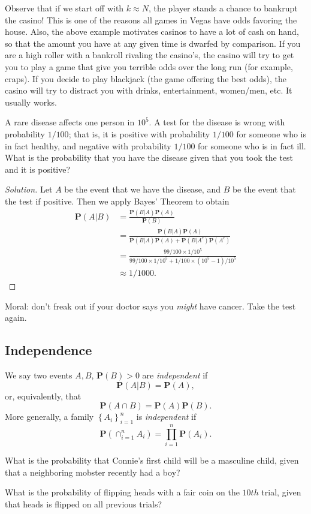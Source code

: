 Observe that if we start off with $k \approx N$, the player stands a chance to
bankrupt the casino! This is one of the reasons all games in Vegas have odds
favoring the house. Also, the above example motivates casinos to have a lot of
cash on hand, so that the amount you have at any given time is dwarfed by
comparison. If you are a high roller with a bankroll rivaling the casino's,
the casino will try to get you to play a game that give you terrible odds over
the long run (for example, craps). If you decide to play blackjack (the game
offering the best odds), the casino will try to distract you with drinks,
entertainment, women/men, etc. It usually works.
\begin{example}
	A rare disease affects one person in $10^5$. A test for the disease
	is wrong with probability $1/100$; that is, it is positive with probability
	$1/100$ for someone who is in fact healthy, and negative
	with probability $1/100$ for someone who is in fact ill. What is the 
	probability
	that you have the disease given that you took the test and it is positive?
\end{example}
\begin{proof}[Solution]
	Let $A$ be the event that we have the disease, and $B$ be the event
	that the test if positive. Then we apply
	Bayes' Theorem to obtain
	\begin{align*}
		\mathbf{P}(A | B) & = \frac{\mathbf{P}(B | A) \mathbf{P}(A)}{\mathbf{P}(B)}
		\\
		& = \frac{\mathbf{P}(B | A) \mathbf{P}(A)}{\mathbf{P}(B|A) \mathbf{P}(A) + \mathbf{P}(B | A^c)
		\mathbf{P}(A^c)}
		\\
		& = \frac{99/100 \times 1/10^5}{99/100 \times 1/10^5 + 1/100 \times 
			(10^5 -
		1)/10^5}
		\\
		& \approx 1/1000.
	\end{align*}
\end{proof}
Moral: don't freak out if your doctor says you \emph{might} have
cancer. Take the test again.
\subsection{Independence}
\begin{definition}
	We say two events $A, B$, $\mathbf{P}(B) > 0$ are \emph{independent} if 
	\[\mathbf{P}(A |
	B) = \mathbf{P}(A),\] or, equivalently, that \[\mathbf{P}(A \cap B) = \mathbf{P}(A) 
	\mathbf{P}(B).\] More generally,
	a family $ {\left\{ A_i \right\}}_{i = 1}^n $ is
	\emph{independent} if 
	\[ \mathbf{P}(\cap_{i = 1}^n A_i) = \prod_{i = 1}^n \mathbf{P}(A_i).\]
\end{definition}
\begin{example}
	What is the probability that Connie's first child will be a masculine child,
	given that a neighboring mobster recently had a boy?
\end{example}
\begin{example}
	What is the probability of flipping heads with a fair coin on the $10th$ 
	trial,
	given that heads is flipped on all previous trials?
\end{example}
